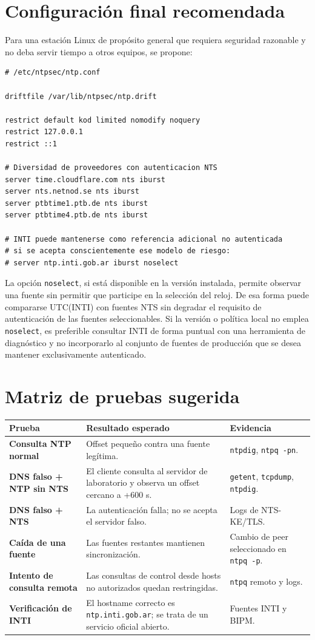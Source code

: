 \documentclass[11pt,a4paper]{article}
\begin{document}
\section{Configuración final recomendada}

Para una estación Linux de propósito general que requiera seguridad razonable y no deba servir tiempo a otros equipos, se propone:

\begin{lstlisting}[style=terminal]
# /etc/ntpsec/ntp.conf

driftfile /var/lib/ntpsec/ntp.drift

restrict default kod limited nomodify noquery
restrict 127.0.0.1
restrict ::1

# Diversidad de proveedores con autenticacion NTS
server time.cloudflare.com nts iburst
server nts.netnod.se nts iburst
server ptbtime1.ptb.de nts iburst
server ptbtime4.ptb.de nts iburst

# INTI puede mantenerse como referencia adicional no autenticada
# si se acepta conscientemente ese modelo de riesgo:
# server ntp.inti.gob.ar iburst noselect
\end{lstlisting}

La opción \texttt{noselect}, si está disponible en la versión instalada, permite observar una fuente sin permitir que participe en la selección del reloj. De esa forma puede compararse UTC(INTI) con fuentes NTS sin degradar el requisito de autenticación de las fuentes seleccionables. Si la versión o política local no emplea \texttt{noselect}, es preferible consultar INTI de forma puntual con una herramienta de diagnóstico y no incorporarlo al conjunto de fuentes de producción que se desea mantener exclusivamente autenticado.

\section{Matriz de pruebas sugerida}

\begin{tabularx}{\textwidth}{>{\bfseries}p{3.4cm} X X}
\toprule
\textbf{Prueba} & \textbf{Resultado esperado} & \textbf{Evidencia} \\
\midrule
Consulta NTP normal & Offset pequeño contra una fuente legítima. & \texttt{ntpdig}, \texttt{ntpq -pn}. \\
DNS falso + NTP sin NTS & El cliente consulta al servidor de laboratorio y observa un offset cercano a +600 s. & \texttt{getent}, \texttt{tcpdump}, \texttt{ntpdig}. \\
DNS falso + NTS & La autenticación falla; no se acepta el servidor falso. & Logs de NTS-KE/TLS. \\
Caída de una fuente & Las fuentes restantes mantienen sincronización. & Cambio de peer seleccionado en \texttt{ntpq -p}. \\
Intento de consulta remota & Las consultas de control desde hosts no autorizados quedan restringidas. & \texttt{ntpq} remoto y logs. \\
Verificación de INTI & El hostname correcto es \texttt{ntp.inti.gob.ar}; se trata de un servicio oficial abierto. & Fuentes INTI y BIPM. \\
\bottomrule
\end{tabularx}
\end{document}
